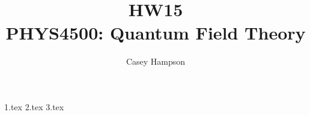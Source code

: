 \documentclass{article}
\title{HW15 \\[5pt] PHYS4500: Quantum Field Theory}
\author{Casey Hampson}
\begin{document}
    \maketitle

    {1.tex}
    {2.tex}
    {3.tex}
\end{document}
